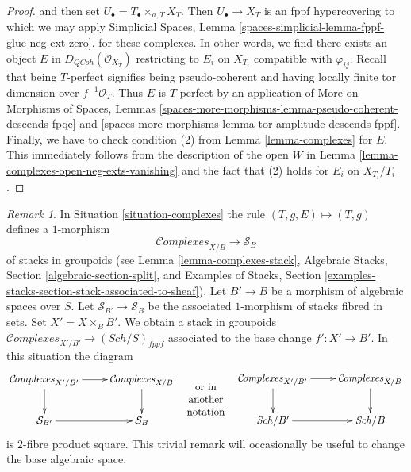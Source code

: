 \documentclass{stacks-project}
\theoremstyle{plain}
\theoremstyle{definition}
\theoremstyle{remark}
\newtheorem{remark}[subsection]{Remark}
\numberwithin{equation}{subsection}
\def\Sch{\mathit{Sch}}
\def\QCoh{\mathit{QCoh}}
\def\Complexesstack{\mathcal{C}\!\mathit{omplexes}}
\begin{document}
\begin{proof}
{and then set $U_\bullet = T_\bullet \times_{a, T} X_T$. Then
$U_\bullet \to X_T$ is an fppf hypercovering to which we may
apply Simplicial Spaces, Lemma
\ref{spaces-simplicial-lemma-fppf-glue-neg-ext-zero}.}
for these complexes. In other words, we find there exists an object
$E$ in $D_\QCoh(\mathcal{O}_{X_T})$ restricting to $E_i$ on $X_{T_i}$
compatible with $\varphi_{ij}$. Recall that being
$T$-perfect signifies being pseudo-coherent and having
locally finite tor dimension over $f^{-1}\mathcal{O}_T$.
Thus $E$ is $T$-perfect by an application of
More on Morphisms of Spaces, Lemmas
\ref{spaces-more-morphisms-lemma-pseudo-coherent-descends-fpqc} and
\ref{spaces-more-morphisms-lemma-tor-amplitude-descends-fppf}.
Finally, we have to check condition (2) from
Lemma \ref{lemma-complexes} for $E$.
This immediately follows from the description of the open $W$
in Lemma \ref{lemma-complexes-open-neg-exts-vanishing}
and the fact that (2) holds for $E_i$ on $X_{T_i}/T_i$.
\end{proof}

\begin{remark}
\label{remark-complexes-base-change}
In Situation \ref{situation-complexes} the rule
$(T, g, E) \mapsto (T, g)$ defines a $1$-morphism
$$
\Complexesstack_{X/B} \longrightarrow \mathcal{S}_B
$$
of stacks in groupoids
(see Lemma \ref{lemma-complexes-stack},
Algebraic Stacks, Section \ref{algebraic-section-split}, and
Examples of Stacks, Section
\ref{examples-stacks-section-stack-associated-to-sheaf}).
Let $B' \to B$ be a morphism of
algebraic spaces over $S$. Let $\mathcal{S}_{B'} \to \mathcal{S}_B$
be the associated $1$-morphism of stacks fibred in sets.
Set $X' = X \times_B B'$.
We obtain a stack in groupoids
$\Complexesstack_{X'/B'} \to (\Sch/S)_{fppf}$
associated to the base change $f' : X' \to B'$. In this situation
the diagram
$$
\vcenter{
\xymatrix{
\Complexesstack_{X'/B'} \ar[r] \ar[d] &
\Complexesstack_{X/B} \ar[d] \\
\mathcal{S}_{B'} \ar[r] & \mathcal{S}_B
}
}
\quad
\begin{matrix}
\text{or in} \\
\text{another} \\
\text{notation}
\end{matrix}
\quad
\vcenter{
\xymatrix{
\Complexesstack_{X'/B'} \ar[r] \ar[d] &
\Complexesstack_{X/B} \ar[d] \\
\Sch/B' \ar[r] & \Sch/B
}
}
$$
is $2$-fibre product square. This trivial remark
will occasionally be useful to change the base algebraic space.
\end{remark}
\end{document}
